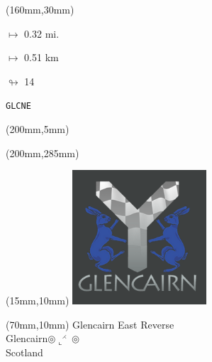 \begin{textblock*}{40mm}(160mm,30mm)%
\Large
\par$\mapsto$ 0.32 mi.
\par$\mapsto$ 0.51 km
\par$\looparrowright$ 14
\par\hfill\tiny\tt GLCNE\\
\end{textblock*}
\begin{textblock*}{20mm}(200mm,5mm)%
\fbox{\thepage}
\label{GLCNE}
\end{textblock*}
\begin{textblock*}{20mm}(200mm,285mm)%
\fbox{\thepage}
\end{textblock*}

\null\newpage
\begin{textblock*}{50mm}(15mm,10mm)%
\includegraphics[width=50mm]{LG/GLCN.png}
\end{textblock*}
\begin{textblock*}{130mm}(70mm,10mm)%
{\fontsize{20}{20}\selectfont Glencairn East Reverse\\}
{\fontsize{16}{16}\selectfont Glencairn\hfill $\circledcirc\llcorner^{\rightthreetimes}\circledcirc$\\}
{\fontsize{12}{12}\selectfont Scotland\\}
\end{textblock*}

